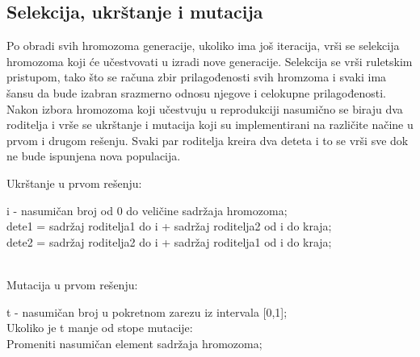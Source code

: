 \documentclass[a4paper]{article}
\begin{document}
\subsection{Selekcija, ukrštanje i mutacija}
\par Po obradi svih hromozoma generacije, ukoliko ima još iteracija, vrši se selekcija hromozoma koji će učestvovati u izradi nove generacije. Selekcija se vrši ruletskim pristupom, tako što se računa zbir prilagođenosti svih hromzoma i svaki ima šansu da bude izabran srazmerno odnosu njegove i celokupne prilagođenosti. Nakon izbora hromozoma koji učestvuju u reprodukciji nasumično se biraju dva roditelja i vrše se ukrštanje i mutacija koji su implementirani na različite načine u prvom i drugom rešenju. Svaki par roditelja kreira dva deteta i to se vrši sve dok ne bude ispunjena nova populacija. 
\begin{tcolorbox}
\begin{center}
Ukrštanje u prvom rešenju: \\
\end{center}
i - nasumičan broj od 0 do veličine sadržaja hromozoma;\\
dete1 = sadržaj roditelja1 do i + sadržaj roditelja2 od i do kraja; \\
dete2 = sadržaj roditelja2 do i + sadržaj roditelja1 od  i do kraja; \\~ \\
\begin{center}
Mutacija u prvom rešenju:  \\
\end{center}
t - nasumičan broj u pokretnom zarezu iz intervala [0,1];\\
Ukoliko je t manje od stope mutacije: \\
\hphantom{tcolorbox}Promeniti nasumičan element sadržaja hromozoma;
\end{tcolorbox}
\end{document}
